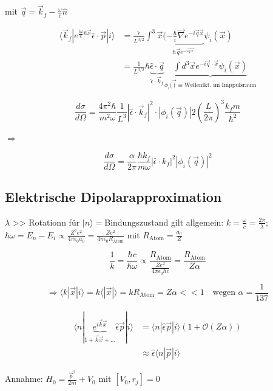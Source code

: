 mit \(\boxed{\vec q = \vec k_f -\frac{\omega}{c}\hat n}\)

\begin{align}
  \langle \vec k_f|e^{\frac{i\omega}{c}\hat n\vec x}\hat \epsilon\cdot\vec p|i\rangle &= \frac{\hat \epsilon}{L^{3/2}} \int^3\vec x \underbrace{(-\frac{\hbar}{i}\vec\nabla e^{-i\vec q \vec x}}_{\hbar \vec q e^{-i\vec q\vec x}}\psi_i(\vec x)\\
  &=\frac{1}{L^{3/2}}\hbar \underbrace{\hat\epsilon\cdot\vec q}_{\hat \epsilon\cdot \vec k_f}\underbrace{\int d^3\vec x e^{-i\vec q\cdot\vec x}\psi_i(\vec x)}_{\phi_i(\vec )\equiv\text{Wellenfkt. im Imppulsraum}}
\end{align}



\[\frac{d\sigma}{d\Omega} = \frac{4\pi^2\hbar}{m^2\omega} \frac{1}{L^3}|\hat \epsilon\cdot\vec k_f|^2\cdot |\phi_i(\vec q)| 2\left(\frac{L}{2\pi}\right)^3\frac{k_fm}{\hbar^2}\]

\(\Rightarrow\)

\[\boxed{\frac{d\sigma}{d\Omega} = \frac{\alpha}{2\pi} \frac{\hbar k_f}{m\omega}|\hat \epsilon\cdot k_f|^2|\phi_i(\vec q)|^2  }\]

\subsection{Elektrische Dipolarapproximation}

\(\lambda\) >> Rotationn für \(|n\rangle=\)Bindungszustand gilt allgemein: \(k=\frac{\omega}{c}=\frac{2\pi}{\lambda}\); \(\hbar\omega = E_n-E_i\propto \frac{Z^2e^2}{4\pi\epsilon_0 a_0}=\frac{Ze^2}{4\pi\epsilon_0 R_{\text{Atom}}}\) mit \(R_{\text{Atom}}=\frac{a_0}{Z}\)

\[\frac{1}{k}=\frac{\hbar c}{\hbar \omega}\propto \frac{R_{\text{Atom}}}{\frac{Ze^2}{4\pi\epsilon_0\hbar c}} = \frac{R_{\text{Atom}}}{Z\alpha}\]

\[\Rightarrow \langle k|\vec x|i\rangle  = k\langle |\vec x|\rangle = kR_{\text{Atom}} = Z\alpha <<1 \quad\text{wegen }\alpha=\frac{1}{137}\]

\begin{align}
  \langle n|\underbrace{e^{i\vec k\vec x}}_{1+\vec k\vec x+...}\hat \epsilon \vec p|i\rangle &=\langle n|\hat \epsilon\vec p|i\rangle (1+\mathcal O(Z\alpha))\\
  &\approx \hat \epsilon \langle n|\vec p|i\rangle
\end{align}

Annahme: \(H_0 = \frac{\vec p^2}{2m}+V_0\) mit \([V_0,r_j]=0\)

